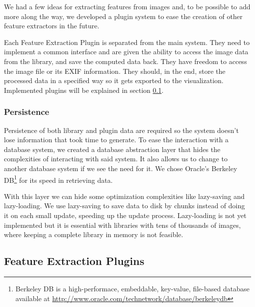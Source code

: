 We had a few ideas for extracting features from images and, to be possible to add more along the way, we developed a plugin system to ease the creation of other feature extractors in the future.

Each Feature Extraction Plugin is separated from the main system. They need to implement a common interface and are given the ability to access the image data from the library, and save the computed data back. They have freedom to access the image file or its \ac{EXIF} information. They should, in the end, store the processed data in a specified way so it gets exported to the visualization. Implemented plugins will be explained in section \ref{sub:plugins}.





\subsubsection{Persistence} %
\label{ssub:Persistence}

Persistence of both library and plugin data are required so the system doesn't lose information that took time to generate. To ease the interaction with a database system, we created a database abstraction layer that hides the complexities of interacting with said system. It also allows us to change to another database system if we see the need for it. We chose Oracle's Berkeley DB\footnote{Berkeley DB is a high-performace, embeddable, key-value, file-based database available at \url{http://www.oracle.com/technetwork/database/berkeleydb}} for its speed in retrieving data.

With this layer we can hide some optimization complexities like lazy-saving and lazy-loading. We use lazy-saving to save data to disk by chunks instead of doing it on each small update, speeding up the update process. Lazy-loading is not yet implemented but it is essential with libraries with tens of thousands of images, where keeping a complete library in memory is not feasible.














\subsection{Feature Extraction Plugins} %
\label{sub:plugins}

